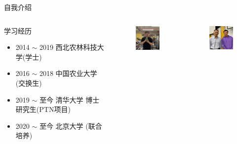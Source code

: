 \begin{frame}{自我介绍}
\begin{columns}
        \begin{block}{\tiny{学习经历}}
            \begin{itemize}
                \item {2014 $ \sim $ 2019 \quad 西北农林科技大学(学士)}
                \item {2016 $ \sim $ 2018 \quad 中国农业大学 (交换生)}
                \item {2019 $ \sim $ 至今 \quad 清华大学 博士研究生(PTN项目)}
                \item {2020 $ \sim $ 至今 \quad 北京大学 (联合培养)}
            \end{itemize}
        \end{block}
        \begin{columns}
            \begin{figure}
                \centering
                \includegraphics[width=3cm]{Images/自我介绍2.png}
            \end{figure}
            \begin{figure}
                \centering
                \includegraphics[width=3cm]{Images/自我介绍3.png}
            \end{figure}
        \end{columns}


        \bigskip
        \bigskip
        \bigskip
        \bigskip
        \bigskip
        \bigskip
        \bigskip
        \bigskip
        \bigskip
        \bigskip
    \end{columns}
\end{frame}

